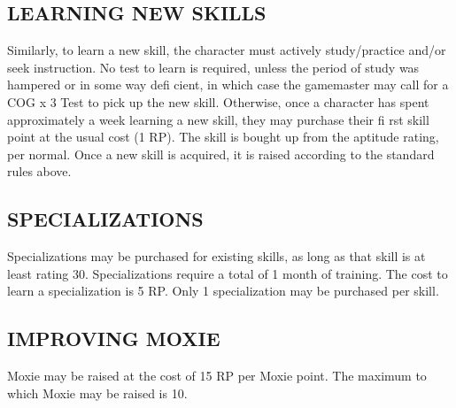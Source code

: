 \subsection{LEARNING NEW SKILLS}
Similarly, to learn a new skill, the character must actively study/practice
and/or seek instruction. No test to learn is required, unless the period of
study was hampered or in some way defi cient, in which case the gamemaster may
call for a COG x 3 Test to pick up the new skill. Otherwise, once a character
has spent approximately a week learning a new skill, they may purchase their fi
rst skill point at the usual cost (1 RP). The skill is bought up from the
aptitude rating, per normal. Once a new skill is acquired, it is raised
according to the standard rules above.

\subsection{SPECIALIZATIONS}
Specializations may be purchased for existing skills, as long as that skill is
at least rating 30. Specializations require a total of 1 month of training. The
cost to learn a specialization is 5 RP. Only 1 specialization may be purchased
per skill.

\subsection{IMPROVING MOXIE}
Moxie may be raised at the cost of 15 RP per Moxie point. The maximum to which
Moxie may be raised is 10.

